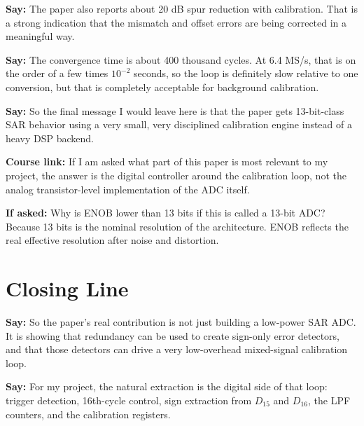 \documentclass[11pt]{article}
\newcommand{\speak}[1]{\textbf{Say:} #1}
\newcommand{\ifasked}[1]{\textbf{If asked:} #1}
\newcommand{\course}[1]{\textbf{Course link:} #1}
\begin{document}
\speak{The paper also reports about 20 dB spur reduction with calibration. That is a strong indication that the mismatch and offset errors are being corrected in a meaningful way.}

\speak{The convergence time is about 400 thousand cycles. At 6.4 MS/s, that is on the order of a few times $10^{-2}$ seconds, so the loop is definitely slow relative to one conversion, but that is completely acceptable for background calibration.}

\speak{So the final message I would leave here is that the paper gets 13-bit-class SAR behavior using a very small, very disciplined calibration engine instead of a heavy DSP backend.}

\course{If I am asked what part of this paper is most relevant to my project, the answer is the digital controller around the calibration loop, not the analog transistor-level implementation of the ADC itself.}

\ifasked{Why is ENOB lower than 13 bits if this is called a 13-bit ADC? Because 13 bits is the nominal resolution of the architecture. ENOB reflects the real effective resolution after noise and distortion.}

\section*{Closing Line}
\speak{So the paper's real contribution is not just building a low-power SAR ADC. It is showing that redundancy can be used to create sign-only error detectors, and that those detectors can drive a very low-overhead mixed-signal calibration loop.}

\speak{For my project, the natural extraction is the digital side of that loop: trigger detection, 16th-cycle control, sign extraction from $D_{15}$ and $D_{16}$, the LPF counters, and the calibration registers.}
\end{document}
